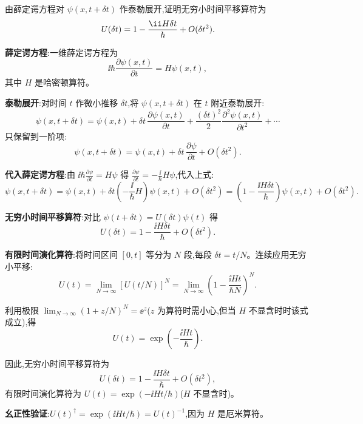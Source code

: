 \begin{question}
由薛定谔方程对 $\psi(x,t+\delta t)$ 作泰勒展开,证明无穷小时间平移算符为
\[
U(\delta t)=1-{\ii H\delta t\over\hbar}+O(\delta t^2).
\]
\end{question}
\begin{solution}
	\textbf{薛定谔方程}:一维薛定谔方程为
	\[
	\ii\hbar\frac{\partial\psi(x,t)}{\partial t} = H\psi(x,t),
	\]
	其中 $H$ 是哈密顿算符。

	\textbf{泰勒展开}:对时间 $t$ 作微小推移 $\delta t$,将 $\psi(x,t+\delta t)$ 在 $t$ 附近泰勒展开:
	\[
	\psi(x,t+\delta t) = \psi(x,t) + \delta t\,\frac{\partial\psi(x,t)}{\partial t} + \frac{(\delta t)^2}{2}\frac{\partial^2\psi(x,t)}{\partial t^2} + \cdots
	\]
	只保留到一阶项:
	\[
	\psi(x,t+\delta t) = \psi(x,t) + \delta t\,\frac{\partial\psi}{\partial t} + O(\delta t^2).
	\]

	\textbf{代入薛定谔方程}:由 $\ii\hbar\frac{\partial\psi}{\partial t}=H\psi$ 得 $\frac{\partial\psi}{\partial t} = -\frac{\ii}{\hbar}H\psi$,代入上式:
	\[
	\psi(x,t+\delta t) = \psi(x,t) + \delta t\left(-\frac{\ii}{\hbar}H\right)\psi(x,t) + O(\delta t^2)
	= \left(1 - \frac{\ii H\delta t}{\hbar}\right)\psi(x,t) + O(\delta t^2).
	\]

	\textbf{无穷小时间平移算符}:对比 $\psi(t+\delta t)=U(\delta t)\psi(t)$ 得
	\[
	U(\delta t) = 1 - \frac{\ii H\delta t}{\hbar} + O(\delta t^2).
	\]

	\textbf{有限时间演化算符}:将时间区间 $[0,t]$ 等分为 $N$ 段,每段 $\delta t = t/N$。连续应用无穷小平移:
	\[
	U(t) = \lim_{N\to\infty} [U(t/N)]^N
	= \lim_{N\to\infty} \left(1 - \frac{\ii H t}{\hbar N}\right)^N.
	\]

	利用极限 $\lim_{N\to\infty}(1+z/N)^N = \ee^z$($z$ 为算符时需小心,但当 $H$ 不显含时时该式成立),得
	\[
	U(t) = \exp\!\left(-\frac{\ii H t}{\hbar}\right).
	\]

	因此,无穷小时间平移算符为
	\[
	\boxed{U(\delta t) = 1 - \frac{\ii H\delta t}{\hbar} + O(\delta t^2)},
	\]
	有限时间演化算符为 $\boxed{U(t)=\exp(-\ii H t/\hbar)}$($H$ 不显含时)。

	\textbf{幺正性验证}:$U(t)^\dagger = \exp(\ii H t/\hbar) = U(t)^{-1}$,因为 $H$ 是厄米算符。
	\end{solution}

